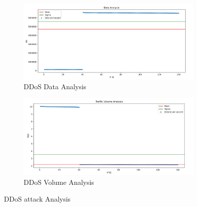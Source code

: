 \begin{figure}[h]
	\begin{subfigure}{0.48\textwidth}
		\includegraphics[width=\textwidth]{imgs/ddos_atk-data_analysis.png}
		\caption{DDoS Data Analysis} 
		\label{fig:ddos_data}
	\end{subfigure}
	\hspace*{\fill} %
	\begin{subfigure}{0.48\textwidth}
		\includegraphics[width=\textwidth]{imgs/ddos_atk-volume_analysis.png}
		\caption{DDoS Volume Analysis} 
		\label{fig:ddos_volume}
	\end{subfigure}
	\caption{DDoS attack Analysis}
	\label{fig:ddos_analysis}
\end{figure}






